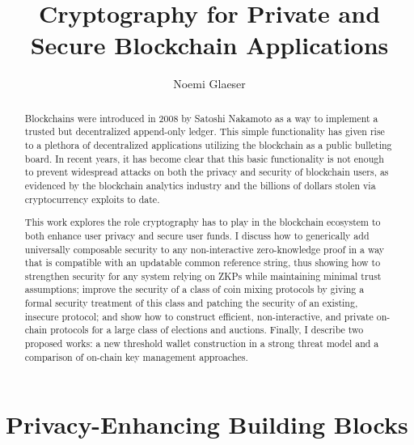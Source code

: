 \documentclass{article}
\title{Cryptography for Private and Secure Blockchain Applications}
\author{Noemi Glaeser}
\date{}
\newcommand{\noemi}[1]{\textcolor{magenta}{Noemi: #1}}
\begin{document}
\maketitle
\begin{abstract}
Blockchains were introduced in 2008 by Satoshi Nakamoto as a way to implement a trusted but decentralized append-only ledger. This simple functionality has given rise to a plethora of decentralized applications utilizing the blockchain as a public bulleting board. In recent years, it has become clear that this basic functionality is not enough to prevent widespread attacks on both the privacy and security of blockchain users, as evidenced by the blockchain analytics industry and the billions of dollars stolen via cryptocurrency exploits to date. 

This work explores the role cryptography has to play in the blockchain ecosystem to both enhance user privacy and secure user funds. I discuss how to generically add universally composable security to any non-interactive zero-knowledge proof in a way that is compatible with an updatable common reference string, thus showing how to strengthen security for any system relying on ZKPs while maintaining minimal trust assumptions; improve the security of a class of coin mixing protocols by giving a formal security treatment of this class and patching the security of an existing, insecure protocol; and show how to construct efficient, non-interactive, and private on-chain protocols for a large class of elections and auctions. Finally, I describe two proposed works: a new threshold wallet construction in a strong threat model and a comparison of on-chain key management approaches.

\end{abstract}

\tableofcontents
\newpage



\section{Privacy-Enhancing Building Blocks}\label{sec:building-blocks}
\end{document}
